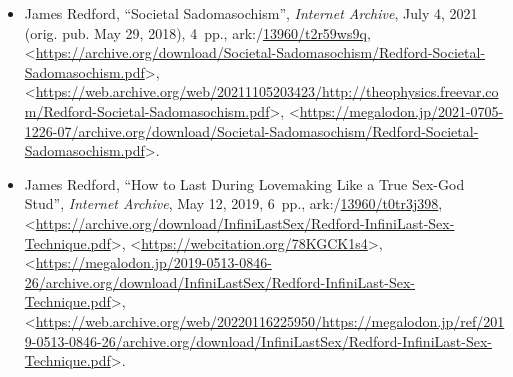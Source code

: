 \documentclass[letterpaper,11pt]{article}
\newcommand{\dsc}{\discretionary{}{}{}}
\begin{document}
\begin{itemize}
\item James Redford, ``Societal Sadomasochism'', \emph{Internet Archive}, July 4, 2021 (orig. pub. May 29, 2018), 4~pp., ark:/\discretionary{}{}{}\href{https://n2t.net/ark:/13960/t2r59ws9q}{13960/\dsc t2r59ws9q}, \textless\href{https://archive.org/download/Societal-Sadomasochism/Redford-Societal-Sadomasochism.pdf}{\textsf{https\dsc :\dsc //\dsc archive\dsc .org/\dsc download/\dsc Societal\dsc -Sadomasochism/\dsc Redford\dsc -Societal\dsc -Sadomasochism\dsc .pdf}}\textgreater , \textless\href{https://web.archive.org/web/20211105203423/http://theophysics.freevar.com/Redford-Societal-Sadomasochism.pdf}{\textsf{https\dsc :\dsc //\dsc web\dsc .archive\dsc .org/\dsc web/\dsc 20211105\dsc 203423/\dsc http\dsc :\dsc //\dsc theophysics\dsc .freevar\dsc .com/\dsc Redford\dsc -Societal\dsc -Sadomasochism\dsc .pdf}}\textgreater , \textless\href{https://megalodon.jp/2021-0705-1226-07/archive.org/download/Societal-Sadomasochism/Redford-Societal-Sadomasochism.pdf}{\textsf{https\dsc :\dsc //\dsc megalodon\dsc .jp/\dsc 2021\dsc -0705\dsc -1226\dsc -07/\dsc archive\dsc .org/\dsc download/\dsc Societal\dsc -Sadomasochism/\dsc Redford\dsc -Societal\dsc -Sadomasochism\dsc .pdf}}\textgreater .

\item James Redford, ``How to Last During Lovemaking Like a True Sex-God Stud'', \emph{Internet Archive}, May 12, 2019, 6~pp., ark:/\discretionary{}{}{}\href{https://n2t.net/ark:/13960/t0tr3j398}{13960/\dsc t0tr3j398}, \textless\href{https://archive.org/download/InfiniLastSex/Redford-InfiniLast-Sex-Technique.pdf}{\textsf{https\dsc :\dsc //\dsc archive\dsc .org/\dsc download/\dsc Infini\dsc Last\dsc Sex/\dsc Redford\dsc -InfiniLast\dsc -Sex\dsc -Technique\dsc .pdf}}\textgreater , \textless\href{https://webcitation.org/78KGCK1s4}{\textsf{https\dsc :\dsc //\dsc webcitation\dsc .org/\dsc 78KGCK1s4}}\textgreater , \textless\href{https://megalodon.jp/2019-0513-0846-26/archive.org/download/InfiniLastSex/Redford-InfiniLast-Sex-Technique.pdf}{\textsf{https\dsc :\dsc //\dsc megalodon\dsc .jp/\dsc 2019\dsc -0513\dsc -0846\dsc -26/\dsc archive\dsc .org/\dsc download/\dsc Infini\dsc Last\dsc Sex/\dsc Redford\dsc -InfiniLast\dsc -Sex\dsc -Technique\dsc .pdf}}\textgreater , \textless\href{https://web.archive.org/web/20220116225950/https://megalodon.jp/ref/2019-0513-0846-26/archive.org/download/InfiniLastSex/Redford-InfiniLast-Sex-Technique.pdf}{\textsf{https\dsc :\dsc //\dsc web\dsc .archive\dsc .org/\dsc web/\dsc 20220116\dsc 225950/\dsc https\dsc :\dsc //\dsc megalodon\dsc .jp/\dsc ref/\dsc 2019\dsc -0513\dsc -0846\dsc -26/\dsc archive\dsc .org/\dsc download/\dsc Infini\dsc Last\dsc Sex/\dsc Redford\dsc -InfiniLast\dsc -Sex\dsc -Technique\dsc .pdf}}\textgreater .
\end{itemize}
\end{document}
